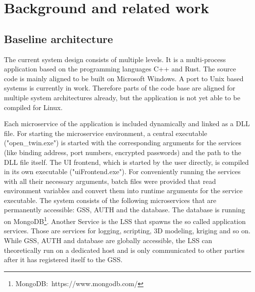
\chapter{Background and related work} %

\label{chap:background} %




\section{Baseline architecture}
The current system design consists of multiple levels. It is a multi-process application based on the programming languages C++ and Rust. The source code is mainly aligned to be built on Microsoft Windows. A port to Unix based systems is currently in work. Therefore parts of the code base are aligned for multiple system architectures already, but the application is not yet able to be compiled for Linux.

Each microservice of the application is included dynamically and linked as a \ac{DLL} file. For starting the microservice environment, a central executable ("open\_twin.exe") is started with the corresponding arguments for the services (like binding address, port numbers, encrypted passwords) and the path to the \ac{DLL} file itself. The UI frontend, which is started by the user directly, is compiled in its own executable ("uiFrontend.exe").
For conveniently running the services with all their necessary arguments, batch files were provided that read environment variables and convert them into runtime arguments for the service executable.
The system consists of the following microservices that are permanently accessible: \ac{GSS}, \ac{AUTH} and the database. The database is running on MongoDB\footnote{MongoDB:~https://www.mongodb.com/}. Another Service is the \ac{LSS} that spawns the so called application services. Those are services for logging, scripting, 3D modeling, kriging and so on.
While \ac{GSS}, \ac{AUTH} and database are globally accessible, the \ac{LSS} can theoretically run on a dedicated host and is only communicated to other parties after it has registered itself to the \ac{GSS}.


